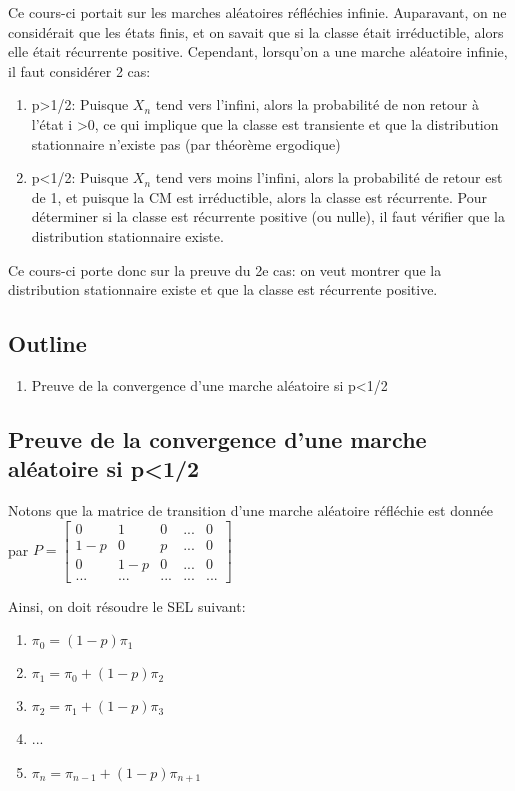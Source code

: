 \documentclass{article}
\begin{document}
Ce cours-ci portait sur les marches aléatoires réfléchies infinie.
Auparavant, on ne considérait que les états finis, et on savait que
si la classe était irréductible, alors elle était récurrente positive.
Cependant, lorsqu'on a une marche aléatoire infinie, il faut considérer 2
cas:
\begin{enumerate}
    \item p>1/2: Puisque $X_n$ tend vers l'infini, alors la probabilité
	de non retour à l'état i >0, ce qui implique que la classe est
	transiente et que la distribution stationnaire n'existe pas
	(par théorème ergodique)
    \item p<1/2: Puisque $X_n$ tend vers moins l'infini, alors la
	probabilité de retour est de 1, et puisque la CM est irréductible,
	alors la classe est récurrente. Pour déterminer si la classe est
	récurrente positive (ou nulle), il faut vérifier que la
	distribution stationnaire existe.
\end{enumerate}

Ce cours-ci porte donc sur la preuve du 2e cas: on veut montrer que
la distribution stationnaire existe et que la classe est récurrente
positive.

\subsection*{Outline}
\begin{enumerate}
    \item Preuve de la convergence d'une marche aléatoire si p<1/2
\end{enumerate}

\subsection{Preuve de la convergence d'une marche aléatoire si p<1/2}

Notons que la matrice de transition d'une marche aléatoire réfléchie
est donnée par
$ P = \begin{bmatrix}
    0 & 1 & 0 & ... & 0\\
    1-p & 0 & p & ... & 0\\
    0 & 1-p & 0 & ... & 0\\
    ... & ... & ... & ... & ...
\end{bmatrix}$

Ainsi, on doit résoudre le SEL suivant:
\begin{enumerate}
    \item $\pi _0 = (1-p) \pi_1$
    \item $\pi _1 = \pi_ 0 + (1-p) \pi_2$
    \item $\pi _2 = \pi_ 1 + (1-p) \pi_3$
    \item ...
    \item $\pi _n = \pi_{n-1} + (1-p) \pi_{n+1}$
\end{enumerate}
\end{document}
